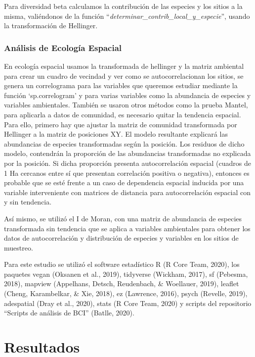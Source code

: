 \documentclass[11pt,]{article}
\begin{document}
Para diversidad beta calculamos la contribución de las especies y los
sitios a la misma, valiéndonos de la función
``\emph{determinar\_contrib\_local\_y\_especie}'', usando la
transformación de Hellinger.

\subsubsection{Análisis de Ecología
Espacial}\label{anuxe1lisis-de-ecologuxeda-espacial}

En ecología espacial usamos la transformada de hellinger y la matriz
ambiental para crear un cuadro de vecindad y ver como se
autocorrelacionan los sitios, se genera un correlograma para las
variables que queremos estudiar mediante la función `sp.correlogram' y
para varias variables como la abundancia de especies y variables
ambientales. También se usaron otros métodos como la prueba Mantel, para
aplicarla a datos de comunidad, es necesario quitar la tendencia
espacial. Para ello, primero hay que ajustar la matriz de comunidad
transformada por Hellinger a la matriz de posiciones XY. El modelo
resultante explicará las abundancias de especies transformadas según la
posición. Los residuos de dicho modelo, contendrán la proporción de las
abundancias transformadas no explicada por la posición. Si dicha
proporción presenta autocorrelación espacial (cuadros de 1 Ha cercanos
entre sí que presentan correlación positiva o negativa), entonces es
probable que se esté frente a un caso de dependencia espacial inducida
por una variable interveniente con matrices de distancia para
autocorrelación espacial con y sin tendencia.

Así mismo, se utilizó el I de Moran, con una matriz de abundancia de
especies transformada sin tendencia que se aplica a variables
ambientales para obtener los datos de autocorrelación y distribución de
especies y variables en los sitios de muestreo.

Para este estudio se utilizó el software estadístico R (R Core Team,
2020), los paquetes vegan (Oksanen et al., 2019), tidyverse (Wickham,
2017), sf (Pebesma, 2018), mapview (Appelhans, Detsch, Reudenbach, \&
Woellauer, 2019), leaflet (Cheng, Karambelkar, \& Xie, 2018), ez
(Lawrence, 2016), psych (Revelle, 2019), adespatial (Dray et al., 2020),
stats (R Core Team, 2020) y scripts del repositorio ``Scripts de
análisis de BCI'' (Batlle, 2020).

\section{Resultados}\label{resultados}
\end{document}
